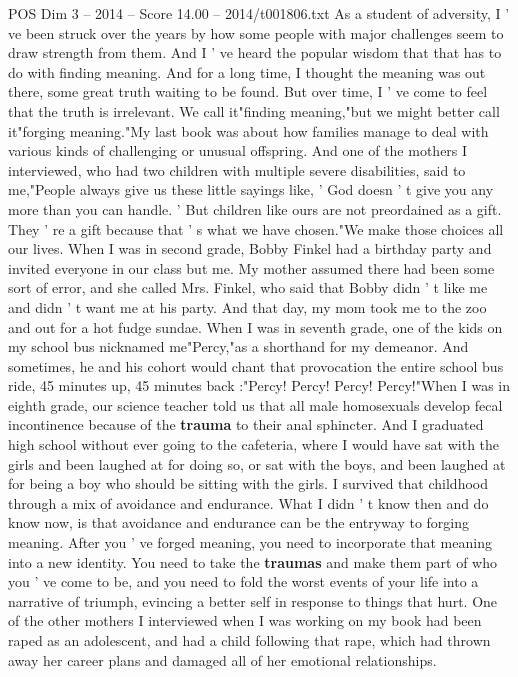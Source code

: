 \begin{textsample}{POS Dim 3 – 2014 – Score 14.00 – 2014/t001806.txt}  \label{ex:f3_pos_037}
As a student of adversity, I ' ve been struck over the years by how some people with major challenges seem to draw strength from them.
And I ' ve heard the popular wisdom that that has to do with finding meaning.
And for a long time, I thought the meaning was out there, some great truth waiting to be found.
But over time, I ' ve come to feel that the truth is irrelevant.
We call it"finding meaning,"but we might better call it"forging meaning."My last book was about how families manage to deal with various kinds of challenging or unusual offspring.
And one of the mothers I interviewed, who had two children with multiple severe disabilities, said to me,"People always give us these little sayings like, ' God doesn ' t give you any more than you can handle. ' But children like ours are not preordained as a gift.
They ' re a gift because that ' s what we have chosen."We make those choices all our lives.
When I was in second grade, Bobby Finkel had a birthday party and invited everyone in our class but me.
My mother assumed there had been some sort of error, and she called Mrs.
Finkel, who said that Bobby didn ' t like me and didn ' t want me at his party.
And that day, my mom took me to the zoo and out for a hot fudge sundae.
When I was in seventh grade, one of the kids on my school bus nicknamed me"Percy,"as a shorthand for my demeanor.
And sometimes, he and his cohort would chant that provocation the entire school bus ride, 45 minutes up, 45 minutes back :"Percy!
Percy!
Percy!
Percy!"When I was in eighth grade, our science teacher told us that all male homosexuals develop fecal incontinence because of the \textbf{trauma} to their anal sphincter.
And I graduated high school without ever going to the cafeteria, where I would have sat with the girls and been laughed at for doing so, or sat with the boys, and been laughed at for being a boy who should be sitting with the girls.
I survived that childhood through a mix of avoidance and endurance.
What I didn ' t know then and do know now, is that avoidance and endurance can be the entryway to forging meaning.
After you ' ve forged meaning, you need to incorporate that meaning into a new identity.
You need to take the \textbf{traumas} and make them part of who you ' ve come to be, and you need to fold the worst events of your life into a narrative of triumph, evincing a better self in response to things that hurt.
One of the other mothers I interviewed when I was working on my book had been raped as an adolescent, and had a child following that rape, which had thrown away her career plans and damaged all of her emotional relationships.

\end{textsample}
